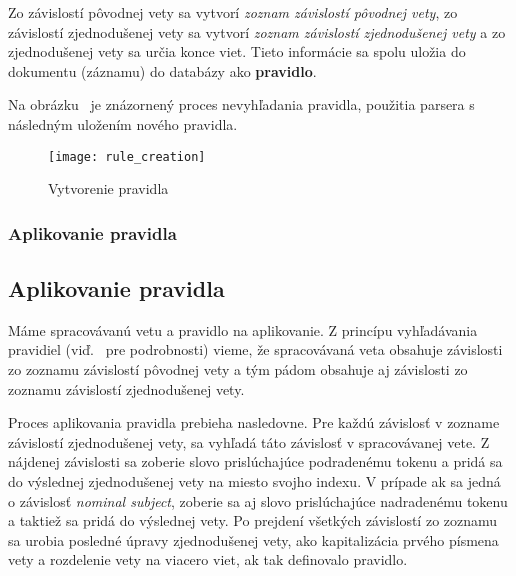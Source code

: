Zo závislostí pôvodnej vety sa vytvorí \textit{zoznam závislostí pôvodnej vety}, zo závislostí zjednodušenej vety sa vytvorí \textit{zoznam závislostí zjednodušenej vety} a zo zjednodušenej vety sa určia konce viet. Tieto informácie sa spolu uložia do dokumentu (záznamu) do databázy ako \textbf{pravidlo}.

Na obrázku~ je znázornený proces nevyhľadania pravidla, použitia parsera s následným uložením nového pravidla.

\begin{figure}[H]
	\begin{center}\texttt{[image: rule\_creation]}\end{center}
	\caption[Vytvorenie pravidla]{Vytvorenie pravidla}\label{fig:rule_creation}
\end{figure}

%
%
{
	\subsubsection{Aplikovanie pravidla}
}
{
	\subsection{Aplikovanie pravidla}
}
\label{subsubsection:rule_application}
Máme spracovávanú vetu a pravidlo na aplikovanie. Z princípu vyhľadávania pravidiel (viď.~ pre podrobnosti) vieme, že spracovávaná veta obsahuje závislosti zo zoznamu závislostí pôvodnej vety a tým pádom obsahuje aj závislosti zo zoznamu závislostí zjednodušenej vety. 

Proces aplikovania pravidla prebieha nasledovne. Pre každú závislosť v zozname závislostí zjednodušenej vety, sa vyhľadá táto závislosť v spracovávanej vete. Z nájdenej závislosti sa zoberie slovo prislúchajúce podradenému tokenu a pridá sa do výslednej zjednodušenej vety na miesto svojho indexu. V prípade ak sa jedná o závislosť \textit{nominal subject}, zoberie sa aj slovo prislúchajúce nadradenému tokenu a taktiež sa pridá do výslednej vety. Po prejdení všetkých závislostí zo zoznamu sa urobia posledné úpravy zjednodušenej vety, ako kapitalizácia prvého písmena vety a rozdelenie vety na viacero viet, ak tak definovalo pravidlo.

